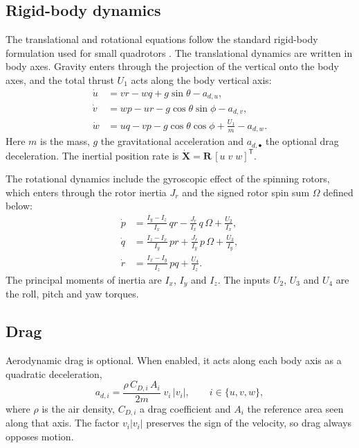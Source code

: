 \documentclass[11pt,a4paper]{article}
\numberwithin{equation}{section}
\newcommand{\vect}[1]{\mathbf{#1}}
\begin{document}
\subsection{Rigid-body dynamics}

The translational and rotational equations follow the standard rigid-body formulation used for small quadrotors \cite{bouabdallah2004}. The translational dynamics are written in body axes. Gravity enters through the projection of the vertical onto the body axes, and the total thrust $U_1$ acts along the body vertical axis:
\begin{equation}
\boxed{
\begin{aligned}
\dot u &= vr - wq + g\sin\theta - a_{d,u},\\
\dot v &= wp - ur - g\cos\theta\sin\phi - a_{d,v},\\
\dot w &= uq - vp - g\cos\theta\cos\phi + \frac{U_1}{m} - a_{d,w}.
\end{aligned}}
\end{equation}
Here $m$ is the mass, $g$ the gravitational acceleration and $a_{d,\bullet}$ the optional drag deceleration. The inertial position rate is $\dot{\vect{X}}=\vect{R}\,[u\;v\;w]^{\mathsf T}$.

The rotational dynamics include the gyroscopic effect of the spinning rotors, which enters through the rotor inertia $J_r$ and the signed rotor spin sum $\Omega$ defined below:
\begin{equation}
\boxed{
\begin{aligned}
\dot p &= \frac{I_y-I_z}{I_x}\,qr - \frac{J_r}{I_x}\,q\,\Omega + \frac{U_2}{I_x},\\
\dot q &= \frac{I_z-I_x}{I_y}\,pr + \frac{J_r}{I_y}\,p\,\Omega + \frac{U_3}{I_y},\\
\dot r &= \frac{I_x-I_y}{I_z}\,pq + \frac{U_4}{I_z}.
\end{aligned}}
\end{equation}
The principal moments of inertia are $I_x$, $I_y$ and $I_z$. The inputs $U_2$, $U_3$ and $U_4$ are the roll, pitch and yaw torques.

\subsection{Drag}

Aerodynamic drag is optional. When enabled, it acts along each body axis as a quadratic deceleration,
\begin{equation}
a_{d,i}=\frac{\rho\,C_{D,i}\,A_i}{2m}\;v_i\,|v_i|,\qquad i\in\{u,v,w\},
\end{equation}
where $\rho$ is the air density, $C_{D,i}$ a drag coefficient and $A_i$ the reference area seen along that axis. The factor $v_i|v_i|$ preserves the sign of the velocity, so drag always opposes motion.
\end{document}
